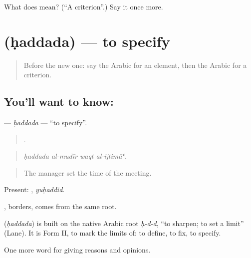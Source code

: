 \begin{tcolorbox}[breakable,colback=teal!4,colframe=teal!35!black,title={Before you move on}]
What does  mean? (\textquotedblleft{}A criterion\textquotedblright{}.) Say it once more.
\end{tcolorbox}
\section[\texorpdfstring{\ar{حدد} (ḥaddada)}{حدد (ḥaddada)}]{ (ḥaddada) — to specify}

\label{lesson:AR-C364-haddada}



\begin{quote}
Before the new one: say the Arabic for an element, then the Arabic for a criterion.
\end{quote}

\subsection*{You'll want to know: }
\textbf{} — \emph{ḥaddada} — \textquotedblleft{}to specify\textquotedblright{}.

\begin{quote}
   .
\end{quote}

\begin{quote}
\emph{ḥaddada al-mudīr waqt al-ijtimāʿ.}
\end{quote}

\begin{quote}
The manager set the time of the meeting.
\end{quote}

Present: , \emph{yuḥaddid}.

, borders, comes from the same root.

\begin{cousinweb}
\textbf{} (\emph{ḥaddada}) is built on the native Arabic root \emph{ḥ-d-d}, \textquotedblleft{}to sharpen; to set a limit\textquotedblright{} (Lane). It is Form II, to mark the limits of: to define, to fix, to specify.
\end{cousinweb}

\begin{grammarlens}[title={What you've built}]
One more word for giving reasons and opinions.
\end{grammarlens}

